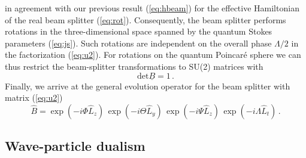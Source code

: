 \documentclass[12pt,amsmath,amssymb]{article}
\numberwithin{equation}{section}
\begin{document}
in agreement with our previous result (\ref{eq:hbeam}) for the effective
Hamiltonian of the real beam splitter (\ref{eq:rot}).
Consequently, the beam splitter performs rotations in the three-dimensional
space spanned by the quantum Stokes parameters (\ref{eq:js}).
Such rotations are independent on the overall phase $\Lambda/2$
in the factorization (\ref{eq:u2}).
For rotations on the quantum Poincar\'e sphere we can thus restrict
the beam-splitter transformations to SU(2) matrices \cite{Cornwell}
with
\begin{equation}
\mathrm{det}\underline{B} = 1\,.
\end{equation}
Finally,
we arrive at the general evolution operator for the beam splitter with
matrix (\ref{eq:u2})
\begin{equation}
\hat{B} = \exp(-i\Phi\hat{L}_z)\, \exp(-i\Theta\hat{L}_y)\,
\exp(-i\Psi\hat{L}_z)\, \exp(-i\Lambda\hat{L}_t)\,.
\end{equation}

\subsection{Wave-particle dualism}
\end{document}
